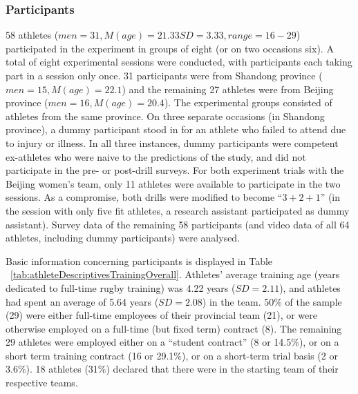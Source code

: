 \subsubsection{Participants}
58 athletes ($men = 31, M(age) = 21.33 SD = 3.33, range = 16-29$) participated in the experiment in groups of eight (or on two occasions six).  A total of eight experimental sessions were conducted, with participants each taking part in a session only once.  31 participants were from Shandong province ($men = 15, M(age) = 22.1$) and the remaining 27 athletes were from Beijing province ($men = 16, M(age) = 20.4$).  The experimental groups consisted of athletes from the same province. On three separate occasions (in Shandong province), a dummy participant stood in for an athlete who failed to attend due to injury or illness.  In all three instances, dummy participants were competent ex-athletes who were naive to the predictions of the study, and did not participate in the pre- or post-drill surveys. For both experiment trials with the Beijing women's team, only 11 athletes were available to participate in the two sessions.  As a compromise, both drills were modified to become ``$3+2+1$'' (in the session with only five fit athletes, a research assistant participated as dummy assistant).  Survey data of the remaining 58 participants (and video data of all 64 athletes, including dummy participants) were analysed.



Basic information concerning participants is displayed in Table ~\ref{tab:athleteDescriptivesTrainingOverall}.  Athletes' average training age (years dedicated to full-time rugby training) was 4.22 years ($SD = 2.11$), and athletes had spent an average of 5.64 years ($SD = 2.08$) in the team.  50\% of the sample (29) were either full-time employees of their provincial team (21), or were otherwise employed on a full-time (but fixed term) contract (8).  The remaining 29 athletes were employed either on a ``student contract'' (8 or 14.5\%), or on a short term training contract (16 or 29.1\%), or on a short-term trial basis (2 or 3.6\%).  18 athletes (31\%) declared that there were in the starting team of their respective teams.

